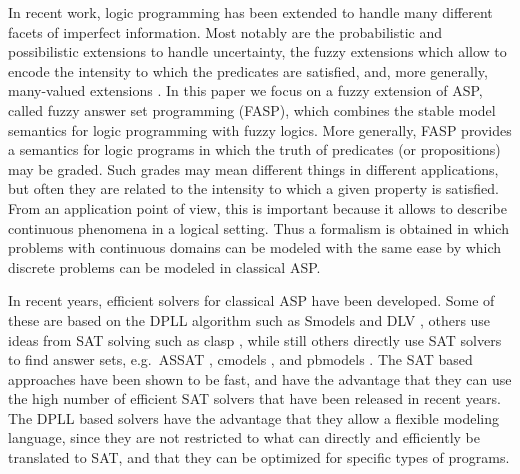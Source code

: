 \documentclass{tlp}
\begin{document}
In recent work, logic programming has been extended to handle many different facets of imperfect information. Most
notably are the probabilistic
\cite{baral:plog,damasio-hybridprobabilistic,Fuhr2000,lukasiewicz-probabilistic,Lukasiewicz-DisjunctiveProbabilisticLP,NgSubrahmanian-1993a,NgSubrahmanian-1994a,Straccia:reasoningweb} and possibilistic
\cite{Alsinet:possibilistic,Kim:UAI2010,nicolas:possibilistic-stable-models,Nicolas:AMAI2006}
extensions to handle uncertainty, the fuzzy extensions
\cite{Cao2000,IshizukaMitsuru-1985a,Luka06,LukaStraccia07,LukaStraccia-TopkRetrieval,MadridOjeda-Aciego-2008a,MadridAciego2009,Saad-2009,Straccia:reasoningweb,FASP:amai,Vojtas01,Wagner-1998} which allow to encode the intensity to
which the predicates are satisfied, and, more generally, many-valued extensions
\cite{damasio:sortedmultiadjoint,DamasioMO07,damasio-antitonic,DamasioViegasPereira2001,DamasioPereira-embeddings,vanEmden1986,Fitting1991,KiferLi-1988a,kifer92theory,Lakshmanan1994,LakshmananSadri-1994,LakshmananSadri-1997,LakshmananSadri-2001,PhDLakshmanan,LoyerStraccia-2002a,LoyerStraccia-2003,NerodeRemmelSubrahmanian1997,Shapiro1983,Straccia05queryanswering,straccia-annotated,straccia:fixedpoint,Subrahmanian1994}.
In this paper we focus on a fuzzy extension of ASP, called fuzzy answer set programming (FASP), which combines the
stable model semantics for logic programming with fuzzy logics. More generally, FASP provides a semantics for logic
programs in which the truth of predicates (or propositions) may be graded. Such grades may mean different things in
different applications, but often they are related to the intensity to which a given property is satisfied. From an
application point of view, this is important because it allows to describe continuous phenomena in a logical setting.
Thus a formalism is obtained in which problems with continuous domains can be modeled with the same ease by which
discrete problems can be modeled in classical ASP. 


In recent years, efficient solvers for classical ASP have been developed. Some of these are based on the DPLL algorithm \cite{dpll} such as Smodels \cite{smodels} and DLV \cite{dlv}, others use ideas from SAT solving such as clasp \cite{clasp}, while still others directly use SAT solvers to find answer sets, e.g.~ASSAT \cite{assat-linzhao}, cmodels \cite{cmodels}, and pbmodels \cite{pbmodels}. The SAT based approaches have been shown to be fast, and have the advantage that they can use the high number of efficient SAT solvers that have been released in recent years. The DPLL based solvers have the advantage that they allow a flexible modeling language, since they are not restricted to what can directly and efficiently be translated to SAT, and that they can be optimized for specific types of programs.
\end{document}
